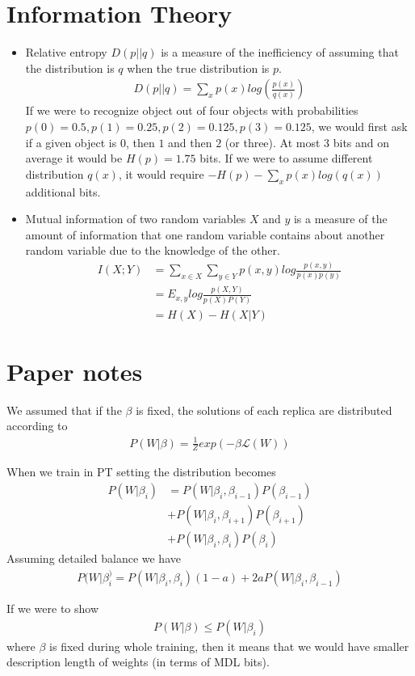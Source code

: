\documentclass[../../main.tex]{subfiles}
\numberwithin{equation}{section}
\begin{document}
\section{Information Theory}
\begin{itemize}
    \item Relative entropy $D(p||q)$ is a measure of the inefficiency of assuming that the distribution is $q$ when the true distribution is $p$.
    \begin{align}
        D(p||q)=\sum\limits_x p(x)log(\frac{p(x)}{q(x)})
    \end{align}
    If we were to recognize object out of four objects with probabilities $p(0)=0.5, p(1) = 0.25, p(2) = 0.125, p(3) = 0.125$, we would first ask if a given object is $0$, then $1$ and then $2$ (or three). At most 3 bits and on average it would be $H(p)=1.75$ bits. If we were to assume different distribution $q(x)$, it would require $-H(p) - \sum \limits_x p(x)log(q(x))$ additional bits.
    \item Mutual information of two random variables $X$ and $y$ is a measure of the amount of information that one random variable contains about another random variable due to the knowledge of the other. 
    \begin{align}
        I(X;Y)&=\sum\limits_{x\in X}\sum\limits_{y\in Y}p(x, y)log \frac{p(x, y)}{p(x)p(y)} \nonumber \\
        &=E_{x, y}log \frac{p(X, Y)}{p(X)P(Y)} \nonumber \\
        &= H(X)-H(X|Y)
    \end{align}
\end{itemize}

\section{Paper notes}
We assumed that if the $\beta$ is fixed, the solutions of each replica are distributed according to
\begin{align}
    P(W|\beta)=\frac{1}{Z}exp(-\beta \mathcal{L}(W))
\end{align}

When we train in PT setting the distribution becomes
\begin{align}
    P(W|\beta_i)&=P(W|\beta_i, \beta_{i-1})P(\beta_{i-1})\\
    &+P(W|\beta_i, \beta_{i+1})P(\beta_{i+1})\nonumber \\ 
    &+P(W|\beta_i, \beta_{i})P(\beta_{i})\nonumber
\end{align}
Assuming detailed balance we have
\begin{align}
    P(W|\beta_i^)=P(W|\beta_i, \beta_i)(1-a)+2aP(W|\beta_i, \beta_{i-1})
\end{align}

If we were to show
\begin{align}
    P(W|\beta)\leq P(W|\beta_i)
\end{align}
where $\beta$ is fixed during whole training, then it means that we would have smaller description length of weights (in terms of MDL bits).
\end{document}
